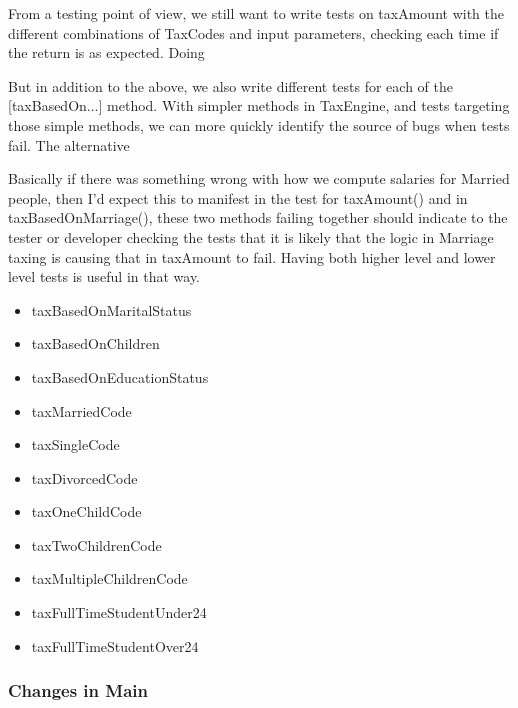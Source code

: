 From a testing point of view, we still want to write tests on taxAmount with the different combinations of TaxCodes and input parameters, checking each time if the return is as expected. Doing  

But in addition to the above, we also write different tests for each of the [taxBasedOn...] method. With simpler methods in TaxEngine, and tests targeting those simple methods, we can more quickly identify the source of bugs when tests fail. The alternative 

Basically if there was something wrong with how we compute salaries for Married people, then I'd expect this to manifest in the test for taxAmount() and
in taxBasedOnMarriage(), these two methods failing together should indicate to the tester or developer checking the tests that it is likely that the logic
in Marriage taxing is causing that in taxAmount to fail. Having both higher level and lower level tests is useful in that way. 

\begin{itemize}
\item taxBasedOnMaritalStatus
\item taxBasedOnChildren
\item taxBasedOnEducationStatus  
\item taxMarriedCode
\item taxSingleCode
\item taxDivorcedCode
\item taxOneChildCode
\item taxTwoChildrenCode
\item taxMultipleChildrenCode
\item taxFullTimeStudentUnder24
\item taxFullTimeStudentOver24
\end{itemize}

\subsubsection{Changes in Main}


